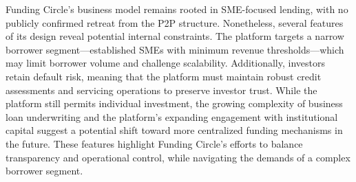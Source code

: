 \documentclass[pdflatex,sn-apa]{sn-jnl}%
\theoremstyle{thmstyleone}%
\theoremstyle{thmstyletwo}%
\theoremstyle{thmstylethree}%
\begin{document}
Funding Circle's business model remains rooted in SME-focused lending, with no publicly confirmed retreat from the P2P structure. Nonetheless, several features of its design reveal potential internal constraints. The platform targets a narrow borrower segment—established SMEs with minimum revenue thresholds—which may limit borrower volume and challenge scalability. Additionally, investors retain default risk, meaning that the platform must maintain robust credit assessments and servicing operations to preserve investor trust. While the platform still permits individual investment, the growing complexity of business loan underwriting and the platform’s expanding engagement with institutional capital suggest a potential shift toward more centralized funding mechanisms in the future. These features highlight Funding Circle’s efforts to balance transparency and operational control, while navigating the demands of a complex borrower segment.
\end{document}
